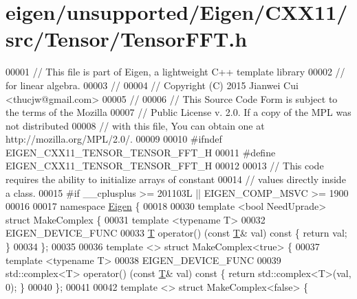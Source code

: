 \hypertarget{eigen_2unsupported_2_eigen_2_c_x_x11_2src_2_tensor_2_tensor_f_f_t_8h_source}{}\section{eigen/unsupported/\+Eigen/\+C\+X\+X11/src/\+Tensor/\+Tensor\+F\+FT.h}
\label{eigen_2unsupported_2_eigen_2_c_x_x11_2src_2_tensor_2_tensor_f_f_t_8h_source}

\begin{DoxyCode}
00001 \textcolor{comment}{// This file is part of Eigen, a lightweight C++ template library}
00002 \textcolor{comment}{// for linear algebra.}
00003 \textcolor{comment}{//}
00004 \textcolor{comment}{// Copyright (C) 2015 Jianwei Cui <thucjw@gmail.com>}
00005 \textcolor{comment}{//}
00006 \textcolor{comment}{// This Source Code Form is subject to the terms of the Mozilla}
00007 \textcolor{comment}{// Public License v. 2.0. If a copy of the MPL was not distributed}
00008 \textcolor{comment}{// with this file, You can obtain one at http://mozilla.org/MPL/2.0/.}
00009 
00010 \textcolor{preprocessor}{#ifndef EIGEN\_CXX11\_TENSOR\_TENSOR\_FFT\_H}
00011 \textcolor{preprocessor}{#define EIGEN\_CXX11\_TENSOR\_TENSOR\_FFT\_H}
00012 
00013 \textcolor{comment}{// This code requires the ability to initialize arrays of constant}
00014 \textcolor{comment}{// values directly inside a class.}
00015 \textcolor{preprocessor}{#if \_\_cplusplus >= 201103L || EIGEN\_COMP\_MSVC >= 1900}
00016 
00017 \textcolor{keyword}{namespace }\hyperlink{namespace_eigen}{Eigen} \{
00018 
00030 \textcolor{keyword}{template} <\textcolor{keywordtype}{bool} NeedUprade> \textcolor{keyword}{struct }MakeComplex \{
00031   \textcolor{keyword}{template} <\textcolor{keyword}{typename} T>
00032   EIGEN\_DEVICE\_FUNC
00033   \hyperlink{group___sparse_core___module_class_eigen_1_1_triplet}{T} operator() (\textcolor{keyword}{const} \hyperlink{group___sparse_core___module_class_eigen_1_1_triplet}{T}& val)\textcolor{keyword}{ const }\{ \textcolor{keywordflow}{return} val; \}
00034 \};
00035 
00036 \textcolor{keyword}{template} <> \textcolor{keyword}{struct }MakeComplex<true> \{
00037   \textcolor{keyword}{template} <\textcolor{keyword}{typename} T>
00038   EIGEN\_DEVICE\_FUNC
00039   std::complex<T> operator() (\textcolor{keyword}{const} \hyperlink{group___sparse_core___module_class_eigen_1_1_triplet}{T}& val)\textcolor{keyword}{ const }\{ \textcolor{keywordflow}{return} std::complex<T>(val, 0); \}
00040 \};
00041 
00042 \textcolor{keyword}{template} <> \textcolor{keyword}{struct }MakeComplex<false> \{

\end{DoxyCode}
